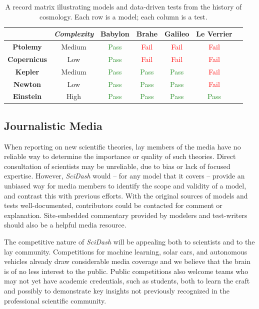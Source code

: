 \documentclass[11pt,letterpaper]{article}
\begin{document}
\begin{table}
\caption{A record matrix illustrating models and data-driven tests from the history of cosmology. Each row is a model; each column is a test.}
\label{table:record_matrix}
\begin{tabular}{| c | c | c | c | c | c | c }
\hline
		& \textit{Complexity} & \textbf{Babylon} & \textbf{Brahe} & \textbf{Galileo} & \textbf{Le Verrier} \\ \hline
	\textbf{Ptolemy} & Medium & \textcolor{ForestGreen}{Pass} & \textcolor{Red}{Fail} & \textcolor{Red}{Fail} & \textcolor{Red}{Fail} \\ \hline
	\textbf{Copernicus} & Low & \textcolor{ForestGreen}{Pass} & \textcolor{Red}{Fail} & \textcolor{Red}{Fail} & \textcolor{Red}{Fail} \\ \hline
	\textbf{Kepler} & Medium & \textcolor{ForestGreen}{Pass} & \textcolor{ForestGreen}{Pass} & \textcolor{ForestGreen}{Pass} & \textcolor{Red}{Fail} \\ \hline
	\textbf{Newton} & Low & \textcolor{ForestGreen}{Pass} & \textcolor{ForestGreen}{Pass} & \textcolor{ForestGreen}{Pass} & \textcolor{Red}{Fail} \\ \hline
	\textbf{Einstein} & High & \textcolor{ForestGreen}{Pass} & \textcolor{ForestGreen}{Pass} & \textcolor{ForestGreen}{Pass} & \textcolor{ForestGreen}{Pass} \\ \hline
\end{tabular}
\end{table}
\leavevmode

\subsection{Journalistic Media}
When reporting on new scientific theories, lay members of the media have no reliable way to determine the importance or quality of such theories.  Direct consultation of scientists may be unreliable, due to bias or lack of focused expertise.  However, \textit{SciDash} would -- for any model that it covers -- provide an unbiased way for media members to identify the scope and validity of a model, and contrast this with previous efforts.  With the original sources of models and tests well-documented, contributors could be contacted for comment or explanation.  Site-embedded commentary provided by modelers and test-writers should also be a helpful media resource.  

The competitive nature of \textit{SciDash} will be appealing both to scientists and to the lay community.  Competitions for machine learning, solar cars, and autonomous vehicles already draw considerable media coverage and we believe that the brain is of no less interest to the public.  Public competitions also welcome teams who may not yet have academic credentials, such as students, both to learn the craft and possibly to demonstrate key insights not previously recognized in the professional scientific community.  
\end{document}
